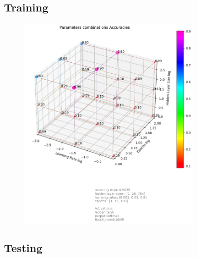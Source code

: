 \documentclass[utf8,1pt]{extarticle} %
\begin{document}
\subsection{Training}
\begin{figure}
    \centering
    \includegraphics[width=0.8\textwidth]{media/training/accuracy_max_0.90_min_0.09__Activations__hidden_tanh_output_softmax_Batch_rate_0.0005_Epochs_89.png}
    \label{fig:comparison}
\end{figure}
\subsection{Testing}
\end{document}
